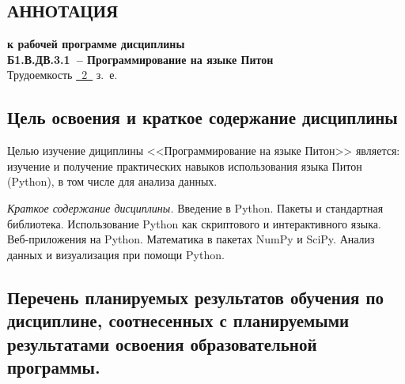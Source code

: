 \documentclass[a4paper,12pt]{article}
\begin{document}
\newpage


\begin{center}
\section{АННОТАЦИЯ}
  {\bf к рабочей программе дисциплины\\
  Б1.В.ДВ.3.1\ -- Программирование на языке Питон} \\
  Трудоемкость \uline{~2~} з.~е.
\end{center}


\subsection{Цель освоения и краткое содержание дисциплины}
  
  Целью изучение дициплины <<Программирование на языке Питон>> является: изучение и получение практических навыков использования языка Питон (Python), в том числе для анализа данных.
  
  \emph{Краткое содержание дисциплины.} Введение в Python. Пакеты и стандартная библиотека. Использование Python как скриптового и интерактивного языка. Веб-приложения на Python. Математика в пакетах NumPy и SciPy. Анализ данных и визуализация при помощи Python.
  
\subsection{Перечень планируемых результатов обучения по дисциплине, соотнесенных с планируемыми результатами освоения образовательной программы.}
\end{document}
